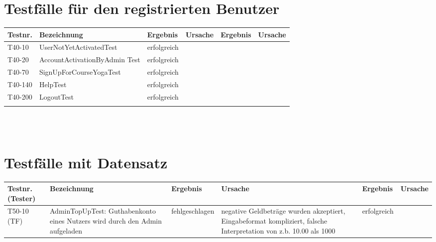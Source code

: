 \begin{landscape}
	\section{Testfälle für den registrierten Benutzer}
		\begin{tabular}{|p{2.0cm} |p{5.0cm}|p{3.0cm}|p{5.0cm}|p{4.0cm}|p{4.0cm}|}
			\hline \textbf{Testnr.} & \textbf{Bezeichnung} & \textbf{Ergebnis} & \textbf{Ursache} & \textbf{Ergebnis} & \textbf{Ursache} \\
			\hline T40-10   &  UserNotYetActivatedTest        & erfolgreich   &        &         &       \\
			\hline T40-20   & AccountActivationByAdmin Test  & erfolgreich    &        &         &       \\	
			\hline T40-70   & SignUpForCourseYogaTest & erfolgreich &        &         &       \\	
			\hline T40-140  & HelpTest & erfolgreich &        &         &       \\	
			\hline T40-200  & LogoutTest & erfolgreich &        &         &       \\	
			\hline       &          &          &        &         &       \\
			\hline 
		\end{tabular} \ \\
		\ \\
			
	\section{Testfälle mit Datensatz}	
		\begin{tabular}{|p{2.0cm} |p{5.0cm}|p{3.0cm}|p{5.0cm}|p{4.0cm}|p{4.0cm}|}
			\hline \textbf{Testnr.(Tester)} & \textbf{Bezeichnung} & \textbf{Ergebnis} & \textbf{Ursache} & \textbf{Ergebnis} & \textbf{Ursache} \\
			
			\hline  T50-10 (TF) & AdminTopUpTest: Guthabenkonto eines Nutzers wird durch den Admin aufgeladen &     fehlgeschlagen     & negative Geldbeträge wurden akzeptiert,  Eingabeformat kompliziert, falsche Interpretation von z.b. 10.00 als 1000       &    erfolgreich     &       \\
			

\end{tabular}
\end{landscape}
